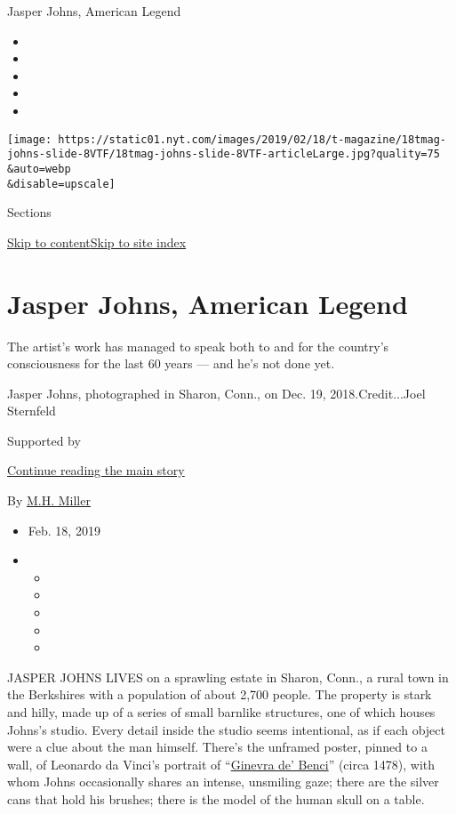 Jasper Johns, American Legend

\begin{itemize}
\item
\item
\item
\item
\item
\end{itemize}

\texttt{[image: https://static01.nyt.com/images/2019/02/18/t-magazine/18tmag-johns-slide-8VTF/18tmag-johns-slide-8VTF-articleLarge.jpg?quality=75\\\&auto=webp\\\&disable=upscale]}

Sections

\protect\hyperlink{site-content}{Skip to
content}\protect\hyperlink{site-index}{Skip to site index}

\hypertarget{jasper-johns-american-legend}{%
\section{Jasper Johns, American
Legend}\label{jasper-johns-american-legend}}

The artist's work has managed to speak both to and for the country's
consciousness for the last 60 years --- and he's not done yet.

Jasper Johns, photographed in Sharon, Conn., on Dec. 19,
2018.Credit...Joel Sternfeld

Supported by

\protect\hyperlink{after-sponsor}{Continue reading the main story}

By \href{https://www.nytimes.com/by/m-h-miller}{M.H. Miller}

\begin{itemize}
\item
  Feb. 18, 2019
\item
  \begin{itemize}
  \item
  \item
  \item
  \item
  \item
  \end{itemize}
\end{itemize}

JASPER JOHNS LIVES on a sprawling estate in Sharon, Conn., a rural town
in the Berkshires with a population of about 2,700 people. The property
is stark and hilly, made up of a series of small barnlike structures,
one of which houses Johns's studio. Every detail inside the studio seems
intentional, as if each object were a clue about the man himself.
There's the unframed poster, pinned to a wall, of Leonardo da Vinci's
portrait of
``\href{https://www.nga.gov/collection/art-object-page.50724.html}{Ginevra
de' Benci}'' (circa 1478), with whom Johns occasionally shares an
intense, unsmiling gaze; there are the silver cans that hold his
brushes; there is the model of the human skull on a table.

